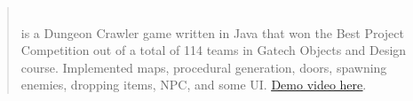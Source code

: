 

\begin{cvparagraph}


\begin{quote}
\\\leading{13pt} 
\thinspace is a Dungeon Crawler game written in Java that won the Best Project Competition out of a total of 114 teams in Gatech Objects and Design course. Implemented maps, procedural generation, doors, spawning enemies, dropping items, NPC, and some UI.  \href{https://www.youtube.com/watch?v=rOLvdaMtE1Y}{\underline{Demo video here}}. 
\end{quote}

\end{cvparagraph}
